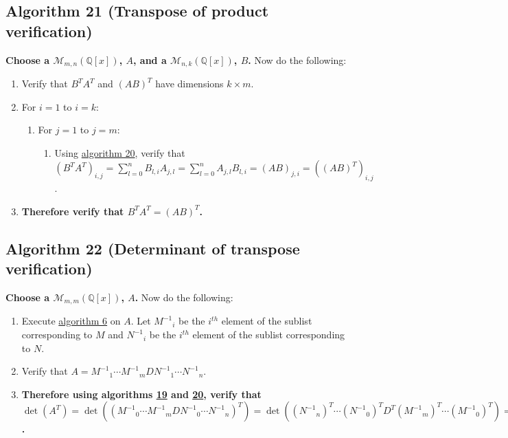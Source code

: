 \documentclass[twocolumn]{article}
\begin{document}
		\subsection{Algorithm 21 (Transpose of product verification)}\label{sec:algorithm 21}
			\textbf{Choose a $\mathcal{M}_{m,n}(\mathbb{Q}[x])$, $A$, and a $\mathcal{M}_{n,k}(\mathbb{Q}[x])$, $B$.} Now do the following:
			\begin{enumerate}
				\item Verify that $B^TA^T$ and $(AB)^T$ have dimensions $k\times m$.
				\item For $i=1$ to $i=k$:
				\begin{enumerate}
					\item For $j=1$ to $j=m$:
					\begin{enumerate}
						\item Using \hyperref[sec:algorithm 20]{algorithm 20}, verify that $(B^TA^T)_{i,j}=\sum_{l=0}^n B_{l,i}A_{j,l}=\sum_{l=0}^n A_{j,l}B_{l,i}=(AB)_{j,i}=((AB)^T)_{i,j}$.
					\end{enumerate}
				\end{enumerate}
				\item \textbf{Therefore verify that $B^TA^T=(AB)^T$.}
			\end{enumerate}
		\subsection{Algorithm 22 (Determinant of transpose verification)}\label{sec:algorithm 22}
			\textbf{Choose a $\mathcal{M}_{m,m}(\mathbb{Q}[x])$, $A$.} Now do the following:
			\begin{enumerate}
				\item Execute \hyperref[sec:algorithm 6]{algorithm 6} on $A$. Let ${M^{-1}}_i$ be the $i^{th}$ element of the sublist corresponding to $M$ and ${N^{-1}}_i$ be the $i^{th}$ element of the sublist corresponding to $N$.
				\item Verify that $A={M^{-1}}_1\cdots {M^{-1}}_mD{N^{-1}}_1\cdots {N^{-1}}_n$.
				\item \textbf{Therefore using algorithms \hyperref[sec:algorithm 19]{19} and \hyperref[sec:algorithm 20]{20}, verify that $\det(A^T)=\det(({M^{-1}}_0\cdots {M^{-1}}_mD{N^{-1}}_0\cdots {N^{-1}}_n)^T)=\det(({N^{-1}}_n)^T\cdots({N^{-1}}_0)^TD^T({M^{-1}}_m)^T\cdots({M^{-1}}_0)^T)=\det(D^T)=\det(D)=\det({M^{-1}}_1\cdots {M^{-1}}_mD{N^{-1}}_1\cdots {N^{-1}}_n)=\det(A)$.}
			\end{enumerate}
\end{document}
